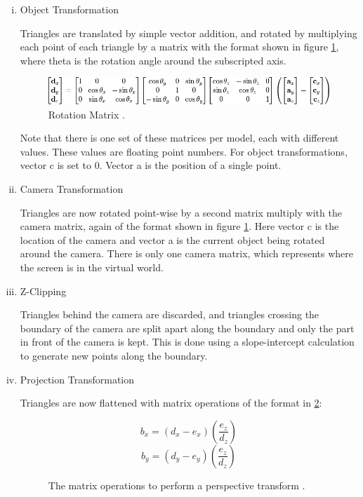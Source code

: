 \documentclass[onecolumn]{IEEEtran}
\begin{document}
\begin{enumerate}[i)]
\item Object Transformation

Triangles are translated by simple vector addition, and rotated by multiplying each point of each triangle by a matrix with the format shown in figure \ref{fig:matrices}, where theta is the rotation angle around the subscripted axis.

\begin{figure}[H]
	\centering
	\includegraphics[width=1.0\textwidth]{matrices.png}
	\caption{Rotation Matrix \cite{3dProjection}.}
	\label{fig:matrices}
\end{figure}

Note that there is one set of these matrices per model, each with different values.  These values are floating point numbers.  For object transformations, vector c is set to 0.  Vector a is the position of a single point.

\item Camera Transformation

Triangles are now rotated point-wise by a second matrix multiply with the camera matrix, again of the format shown in figure \ref{fig:matrices}.  Here vector c is the location of the camera and vector a is the current object being rotated around the camera.   There is only one camera matrix, which represents where the screen is in the virtual world.

\item Z-Clipping

Triangles behind the camera are discarded, and triangles crossing the boundary of the camera are split apart along the boundary and only the part in front of the camera is kept.  This is done using a slope-intercept calculation to generate new points along the boundary.

\item Projection Transformation

Triangles are now flattened with matrix operations of the format in \ref{fig:projectionMat}:

\begin{figure}[H]
	\centering
	$$b_x = (d_x - e_x)(\frac{e_z}{d_z})$$
	$$b_y = (d_y - e_y)(\frac{e_z}{d_z})$$
	\caption{The matrix operations to perform a perspective transform \cite{3dProjection}.}
	\label{fig:projectionMat}
\end{figure}


\end{enumerate}
\end{document}
